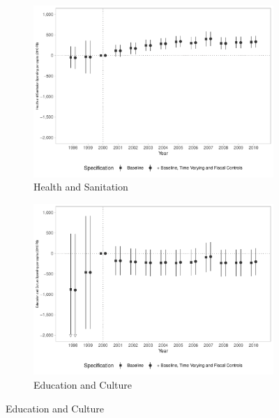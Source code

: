 \begin{figure}[h!]
    \begin{center}
    \caption{Effects on Public Spending per capita - By Category}\label{fig:b2}
    \begin{subfigure}{0.48\textwidth}
        \caption{\scriptsize Health and Sanitation}\label{fig:b2a}
        \centering
        \includegraphics[width=\textwidth]{plots/finbra_desp_saude_san_pcapita_dist_ec29_baseline_dist_ec29_baseline_B2.pdf}
    \end{subfigure}
    \begin{subfigure}{0.48\textwidth}
        \centering
        \caption{\scriptsize Education and Culture}\label{fig:b2b}
        \includegraphics[width=\textwidth]{plots/finbra_desp_educ_cultura_pcapita_dist_ec29_baseline_dist_ec29_baseline_B2.pdf}

\end{subfigure}
\end{center}
\end{figure}
